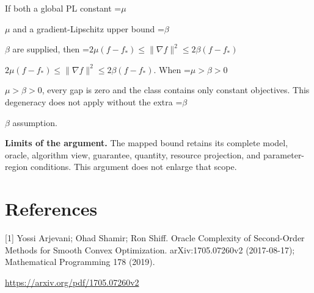 \documentclass[10pt,a4paper]{article}
\newcommand{\AtlasMath}[1]{\par\begingroup\centering\setbox0=\hbox{$\displaystyle #1$}\ifdim\wd0>1.4\linewidth\typeout{ATLAS WIDE FORMULA: \the\wd0}\fi\ifdim\wd0>\linewidth\resizebox{\linewidth}{!}{\box0}\else\box0\fi\par\endgroup}
\newcommand{\AtlasInlineMath}[1]{\begingroup\setbox0=\hbox{$#1$}\ifdim\wd0>.4\linewidth\endgroup\AtlasMath{#1}\else\endgroup$#1$\fi}
\begin{document}
If both a global PL constant \AtlasInlineMath{\mu} and a gradient-Lipschitz upper bound \AtlasInlineMath{\beta} are supplied, then \AtlasInlineMath{2\mu(f-f_*)\le\|\nabla f\|^2\le2\beta(f-f_*)}. When \AtlasInlineMath{\mu>\beta>0}, every gap is zero and the class contains only constant objectives. This degeneracy does not apply without the extra \AtlasInlineMath{\beta} assumption.

\textbf{Limits of the argument.} The mapped bound retains its complete model, oracle, algorithm view, guarantee, quantity, resource projection, and parameter-region conditions. This argument does not enlarge that scope.

\section{References}
[1] Yossi Arjevani; Ohad Shamir; Ron Shiff. Oracle Complexity of Second-Order Methods for Smooth Convex Optimization. arXiv:1705.07260v2 (2017-08-17); Mathematical Programming 178 (2019).

\url{https://arxiv.org/pdf/1705.07260v2}
\end{document}

